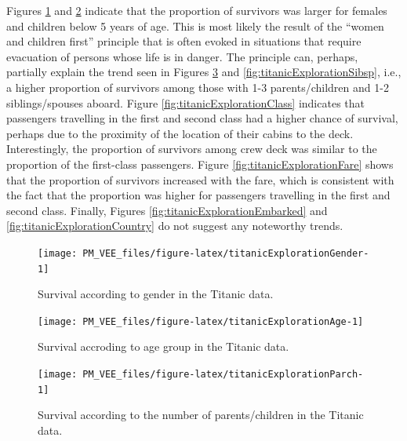 \documentclass[12pt,]{krantz}
\begin{document}
Figures \ref{fig:titanicExplorationGender} and \ref{fig:titanicExplorationAge} indicate that the proportion of survivors was larger for females and children below 5 years of age. This is most likely the result of the ``women and children first'' principle that is often evoked in situations that require evacuation of persons whose life is in danger. The principle can, perhaps, partially explain the trend seen in Figures \ref{fig:titanicExplorationParch} and \ref{fig:titanicExplorationSibsp}, i.e., a higher proportion of survivors among those with 1-3 parents/children and 1-2 siblings/spouses aboard. Figure \ref{fig:titanicExplorationClass} indicates that passengers travelling in the first and second class had a higher chance of survival, perhaps due to the proximity of the location of their cabins to the deck. Interestingly, the proportion of survivors among crew deck was similar to the proportion of the first-class passengers. Figure \ref{fig:titanicExplorationFare} shows that the proportion of survivors increased with the fare, which is consistent with the fact that the proportion was higher for passengers travelling in the first and second class. Finally, Figures \ref{fig:titanicExplorationEmbarked} and \ref{fig:titanicExplorationCountry} do not suggest any noteworthy trends.

\begin{figure}

{\centering \texttt{[image: PM\_VEE\_files/figure-latex/titanicExplorationGender-1]} 

}

\caption{Survival according to gender in the Titanic data.}\label{fig:titanicExplorationGender}
\end{figure}

\begin{figure}

{\centering \texttt{[image: PM\_VEE\_files/figure-latex/titanicExplorationAge-1]} 

}

\caption{Survival accroding to age group in the Titanic data.}\label{fig:titanicExplorationAge}
\end{figure}

\begin{figure}

{\centering \texttt{[image: PM\_VEE\_files/figure-latex/titanicExplorationParch-1]} 

}

\caption{Survival according to the number of parents/children in the Titanic data.}\label{fig:titanicExplorationParch}
\end{figure}
\end{document}

